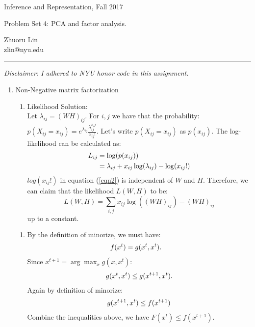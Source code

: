 \documentclass{article}
\newcommand{\ruleskip}{\bigskip\hrule\bigskip}
\begin{document}
\pagestyle{myheadings} 

{\LARGE
\begin{center}Inference and Representation, Fall 2017\end{center}
}

{\Large
Problem Set 4: PCA and factor analysis.
}
\begin{center}
Zhuoru Lin\\
zlin@nyu.edu
\end{center}


\ruleskip 
{\em Disclaimer: 
I adhered to NYU honor code in this assignment. }
\begin{enumerate}
\item Non-Negative  matrix factorization
\begin{enumerate}
\item Likelihood
Solution:\\
Let $\lambda_{ij}=(WH)_{ij}$. For $i,j$ we have that the probability: $p(X_{ij}=x_{ij})=e^{
\lambda_{ij}} \frac{\lambda_{ij}^{x_ij}}{x_{ij}!}$. Let's write $p(X_{ij}=x_{ij})$ as $p(x_{ij})$. The log-likelihood can be calculated as:
\begin{align}
L_{ij} &= \log (p(x_{ij})) \notag \\ 
&=\lambda_{ij} + x_{ij} \log(\lambda_{ij}) - \log(x_{ij}!) \label{eqn2}
\end{align}
$log(x_{ij}!)$ in equation (\ref{eqn2}) is independent of $W$ and $H$. Therefore, we can claim that the likelihood $L(W,H)$ to be:
\begin{equation}
L(W,H) = \sum_{i,j} x_{ij} \log((WH)_{ij}) - (WH)_{ij} \label{likelihood}
\end{equation}
up to a constant.
\end{enumerate}

\pagebreak
\begin{enumerate}
\item By the definition of minorize, we must have:
\begin{align}
f(x^{t})&=g(x^{t}, x^{t}). \notag
\end{align}
Since $x^{t+1} = \arg \max_{x} g(x, x^{t})$:
\begin{equation}
g(x^t, x^t) \leq g(x^{t+1}, x^{t}). \notag
\end{equation}
Again by definition of minorize:
\begin{equation}
g(x^{t+1}, x^{t}) \leq f(x^{t+1}) \notag
\end{equation}
Combine the inequalities above, we have $F(x^{t}) \leq f(x^{t+1})$.
\pagebreak


\end{enumerate}
\end{enumerate}
\end{document}
